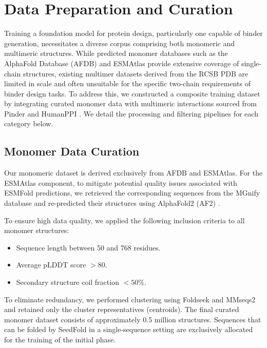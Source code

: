 \section{Data Preparation and Curation}
\label{app:data_prep}

Training a foundation model for protein design, particularly one capable of binder generation, necessitates a diverse corpus comprising both monomeric and multimeric structures. While predicted monomer databases such as the AlphaFold Database (AFDB) \cite{varadiAlphaFoldProteinStructure2022a} and ESMAtlas \cite{lin2023evolutionary} provide extensive coverage of single-chain structures, existing multimer datasets derived from the RCSB PDB \cite{berman2000protein} are limited in scale and often unsuitable for the specific two-chain requirements of binder design tasks. To address this, we constructed a composite training dataset by integrating curated monomer data with multimeric interactions sourced from Pinder \cite{kovtun2024pinder} and HumanPPI \cite{zhangPredictingProteinproteinInteractions2025}. We detail the processing and filtering pipelines for each category below.

\subsection{Monomer Data Curation}
Our monomeric dataset is derived exclusively from AFDB and ESMAtlas. For the ESMAtlas component, to mitigate potential quality issues associated with ESMFold \cite{lin2023evolutionary} predictions, we retrieved the corresponding sequences from the MGnify database \cite{richardson2023mgnify} and re-predicted their structures using AlphaFold2 (AF2) \cite{jumper2021highly}. 

To ensure high data quality, we applied the following inclusion criteria to all monomer structures:
\begin{itemize}
    \item Sequence length between 50 and 768 residues.
    \item Average pLDDT score $> 80$.
    \item Secondary structure coil fraction $< 50\%$.
\end{itemize}
To eliminate redundancy, we performed clustering using Foldseek \cite{vankempenFastAccurateProtein2024} and MMseqs2 \cite{steineggerMMseqs2EnablesSensitive2017} and retained only the cluster representatives (centroids). The final curated monomer dataset consists of approximately 0.5 million structures. Sequences that can be folded by SeedFold \cite{seedfold} in a single-sequence setting are exclusively allocated for the training of the initial phase.

